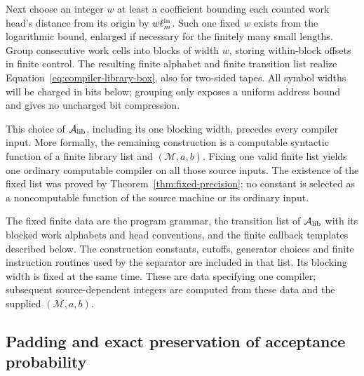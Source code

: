 Next choose an integer $w$ at least a coefficient bounding each counted
work head's distance from its origin by $w\ell_m^{\rm in}$.  Such one fixed
$w$ exists from the logarithmic bound, enlarged if necessary for the
finitely many small lengths.  Group consecutive work cells into blocks
of width $w$, storing within-block offsets in finite control.  The
resulting finite alphabet and finite transition list realize
Equation~\eqref{eq:compiler-library-box}, also for two-sided tapes.
All symbol widths will be charged in bits below; grouping only exposes
a uniform address bound and gives no uncharged bit compression.

This choice of ${\mathcal A_{\rm lib}}$, including its one blocking width, precedes every
compiler input.  More formally, the remaining construction is a
computable syntactic function of a finite library list and
$({\mathcal M},a,b)$.  Fixing one valid finite list yields one ordinary
computable compiler on all those source inputs.  The existence
of the fixed list was proved by Theorem~\ref{thm:fixed-precision};
no constant is selected as a noncomputable function of the source
machine or its ordinary input.

The fixed finite data are the program grammar, the transition list of
${\mathcal A_{\rm lib}}$ with its blocked work alphabets and head conventions, and the
finite callback templates described below. The construction constants,
cutoffs, generator choices and finite instruction routines used by the
separator are included in that list. Its blocking width is fixed at
the same time. These are data specifying one compiler; subsequent
source-dependent integers are computed from these data and the supplied
$({\mathcal M},a,b)$.

\subsection{Padding and exact preservation of acceptance probability}
\label{subsec:compiler-padding}

